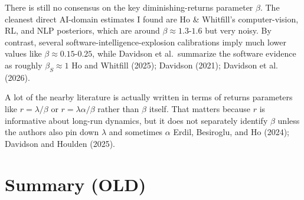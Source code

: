 \documentclass[
  11pt,
  letterpaper,
  DIV=11,
  numbers=noendperiod]{scrartcl}
\begin{document}
\begin{description}
There is still no consensus on the key diminishing-returns parameter
\(\beta\). The cleanest direct AI-domain estimates I found are Ho \&
Whitfill's computer-vision, RL, and NLP posteriors, which are around
\(\beta \approx 1.3\)-\(1.6\) but very noisy. By contrast, several
software-intelligence-explosion calibrations imply much lower values
like \(\beta \approx 0.15\)-\(0.25\), while Davidson et al.~summarize
the software evidence as roughly \(\beta_S \approx 1\) Ho and Whitfill
(2025); Davidson (2021); Davidson et al. (2026).

A lot of the nearby literature is actually written in terms of returns
parameters like \(r=\lambda/\beta\) or \(r=\lambda \alpha / \beta\)
rather than \(\beta\) itself. That matters because \(r\) is informative
about long-run dynamics, but it does not separately identify \(\beta\)
unless the authors also pin down \(\lambda\) and sometimes \(\alpha\)
Erdil, Besiroglu, and Ho (2024); Davidson and Houlden (2025).
\end{description}

\section{Summary (OLD)}\label{summary-old}
\end{document}
